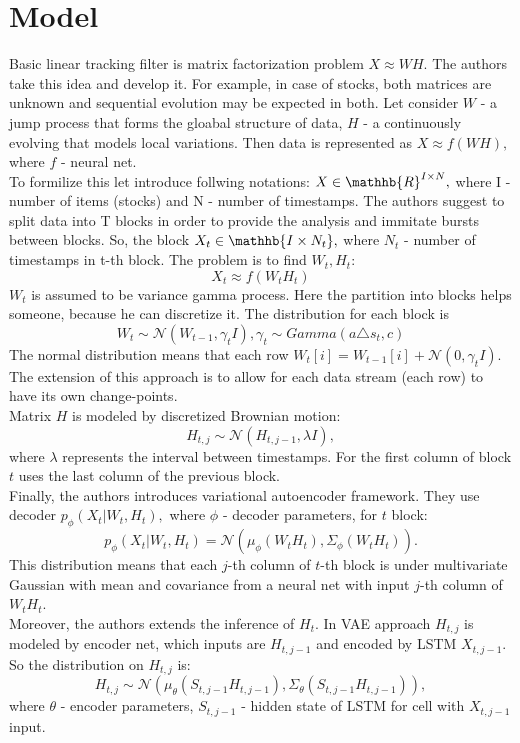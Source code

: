 \documentclass{article}
\begin{document}
\section{Model}

Basic linear tracking filter is matrix factorization problem $X \approx WH.$ The authors take this idea and develop it. For example, in case of stocks, both matrices are unknown and sequential evolution may be expected in both. Let consider $W$ - a jump process that forms the gloabal structure of data, $H$ - a continuously evolving that models local variations. Then data is represented as $X \approx f(WH),$ where $f$ - neural net.\\
To formilize this let introduce follwing notations: $X \in \mathhb{R}^{I\times N},$ where I - number of items (stocks) and N - number of timestamps.  The authors suggest to split data into T blocks in order to provide the analysis and immitate bursts between blocks. So, the block $X_t \in \mathhb{I \times N_t},$ where $N_t$ - number of timestamps in t-th block. The problem is to find $W_t, H_t$:
$$X_t \approx f(W_tH_t)$$
$W_t$ is assumed to be variance gamma process. Here the partition into blocks helps someone, because he can discretize it. The distribution for each block is 
$$W_t \sim \mathcal{N}(W_{t-1}, \gamma_t I), \gamma_t \sim Gamma(a\triangle s_t, c)$$
The normal distribution means that each row $W_t[i] = W_{t-1}[i] + \mathcal{N}(0, \gamma_t I).$\\
The extension of this approach is to allow for each data stream (each row) to have its own change-points.\\
Matrix $H$ is modeled by discretized Brownian motion:
$$H_{t, j} \sim \mathcal{N}(H_{t, j-1}, \lambda I),$$
where $\lambda$ represents the interval between timestamps. For the first column of block $t$ uses the last column of the previous block.\\
Finally, the authors introduces variational autoencoder framework. They use decoder $p_{\phi}(X_t | W_t, H_t), $ where $\phi$ - decoder parameters, for $t$ block:
$$p_{\phi}(X_t | W_t, H_t) = \mathcal{N}(\mu_{\phi}(W_t H_t), \Sigma_{\phi}(W_t H_t)).$$
This distribution means that each $j$-th column of $t$-th block is under multivariate Gaussian with mean and covariance from a neural net with input $j$-th column of $W_tH_t.$ \\
Moreover, the authors extends the inference of $H_t.$ In VAE approach $H_{t, j}$ is modeled by encoder net, which inputs are $H_{t, j-1}$ and encoded by LSTM $X_{t, j-1}$.
So the distribution on $H_{t, j}$ is:
$$H_{t, j} \sim \mathcal{N}(\mu_{\theta}(S_{t, j-1} H_{t, j-1}), \Sigma_{\theta}(S_{t, j-1} H_{t, j-1})),$$
where $\theta$ - encoder parameters, $S_{t, j-1}$ - hidden state of LSTM for cell with $X_{t, j-1}$ input.
\end{document}
